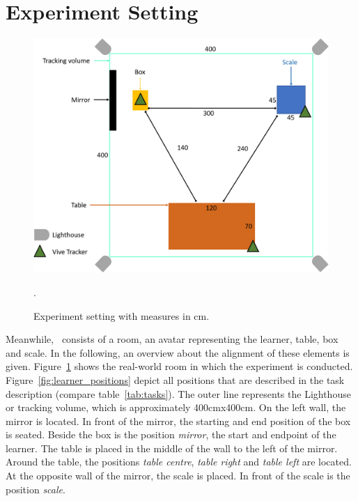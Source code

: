 \section{Experiment Setting}
\label{sec:experimentSetting}
\begin{figure}[H]
	\centering
	\includegraphics[width=\textwidth]{figures/study_setting.png}
	\caption[Experiment setting]{Experiment setting with measures in cm.}.
	\label{fig:study_setting}
\end{figure}
Meanwhile, \exgo\ consists of a room, an avatar representing the learner, table, box and scale. In the following, an overview about the alignment of these elements is given. Figure~\ref{fig:study_setting} shows the real-world room in which the experiment is conducted. Figure~\ref{fig:learner_positions} depict all positions that are described in the task description (compare table~\ref{tab:tasks}). The outer line represents the Lighthouse or tracking volume, which is approximately 400cmx400cm. On the left wall, the mirror is located. In front of the mirror, the starting and end position of the box is seated. Beside the box is the position \textit{mirror}, the start and endpoint of the learner. The table is placed in the middle of the wall to the left of the mirror. Around the table, the positions \textit{table centre}, \textit{table right} and \textit{table left} are located. At the opposite wall of the mirror, the scale is placed. In front of the scale is the position \textit{scale}.
